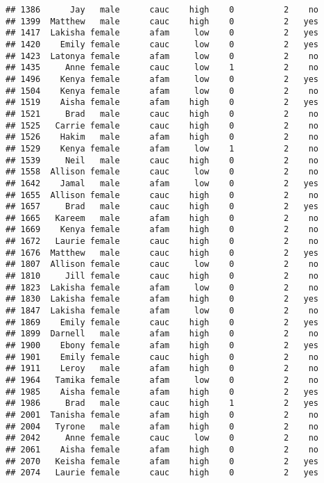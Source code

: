 \documentclass[
]{article}
\begin{document}
\begin{verbatim}
## 1386      Jay   male      cauc    high    0          2    no
## 1399  Matthew   male      cauc    high    0          2   yes
## 1417  Lakisha female      afam     low    0          2   yes
## 1420    Emily female      cauc     low    0          2   yes
## 1423  Latonya female      afam     low    0          2    no
## 1435     Anne female      cauc     low    1          2    no
## 1496    Kenya female      afam     low    0          2   yes
## 1504    Kenya female      afam     low    0          2    no
## 1519    Aisha female      afam    high    0          2   yes
## 1521     Brad   male      cauc    high    0          2    no
## 1525   Carrie female      cauc    high    0          2    no
## 1526    Hakim   male      afam    high    0          2    no
## 1529    Kenya female      afam     low    1          2    no
## 1539     Neil   male      cauc    high    0          2    no
## 1558  Allison female      cauc     low    0          2    no
## 1642    Jamal   male      afam     low    0          2   yes
## 1655  Allison female      cauc    high    0          2    no
## 1657     Brad   male      cauc    high    0          2   yes
## 1665   Kareem   male      afam    high    0          2    no
## 1669    Kenya female      afam    high    0          2    no
## 1672   Laurie female      cauc    high    0          2    no
## 1676  Matthew   male      cauc    high    0          2   yes
## 1807  Allison female      cauc     low    0          2    no
## 1810     Jill female      cauc    high    0          2    no
## 1823  Lakisha female      afam     low    0          2    no
## 1830  Lakisha female      afam    high    0          2   yes
## 1847  Lakisha female      afam     low    0          2    no
## 1869    Emily female      cauc    high    0          2   yes
## 1899  Darnell   male      afam    high    0          2    no
## 1900    Ebony female      afam    high    0          2   yes
## 1901    Emily female      cauc    high    0          2    no
## 1911    Leroy   male      afam    high    0          2    no
## 1964   Tamika female      afam     low    0          2    no
## 1985    Aisha female      afam    high    0          2   yes
## 1986     Brad   male      cauc    high    1          2   yes
## 2001  Tanisha female      afam    high    0          2    no
## 2004   Tyrone   male      afam    high    0          2    no
## 2042     Anne female      cauc     low    0          2    no
## 2061    Aisha female      afam    high    0          2    no
## 2070   Keisha female      afam    high    0          2   yes
## 2074   Laurie female      cauc    high    0          2   yes

\end{verbatim}
\end{document}

